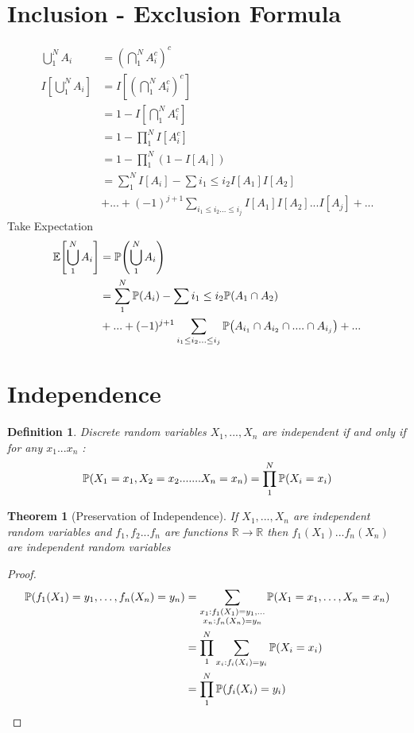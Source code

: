 \documentclass{notes}
\theoremstyle{plain}
\newtheorem{theorem}{Theorem}[chapter]
\newtheorem{definition}{Definition}[chapter]
\newcommand{\bP}{\mathbb{P}}
\newcommand{\bR}{\mathbb{R}}
\newcommand{\bE}{\mathbb{E}}
\newcommand{\prob}[1]{\bP \negthinspace\left(#1\right)}
\newcommand{\expect}[1]{\bE\!\left[#1\right]}
\begin{document}
\section{Inclusion - Exclusion Formula}
\begin{align*}
\bigcup_{1}^{N} A_i &= \left(\bigcap_{1}^{N} A_i^c\right)^c\\
I\left[\bigcup_{1}^{N} A_i\right] 
&=I\left[\left(\bigcap_{1}^{N} A_i^c\right)^c\right]\\
&= 1 - I\left[\bigcap_{1}^{N} A_i^c\right]\\
&= 1 - \prod_1^N I[A_i^c]\\
&= 1 - \prod_1^N\left(1 - I[A_i]\right)\\
&=\sum_1^NI[A_i] - \sum{i_1\le i_2} I[A_1]I[A_2]\\
&+...+ (-1)^{j+1} \sum_{i_1\le i_2 ...\le i_j}I[A_1]I[A_2]...I[A_j] +...
\end{align*}
Take Expectation
\begin{align*}
\expect{\bigcup_{1}^{N} A_i} &= \prob{\bigcup_{1}^{N} A_i}\\
&= \sum_1^N \prob{A_i} - \sum{i_1\le i_2} \prob{A_1 \cap A_2}\\
&+...+(-1)^{j+1}  \sum_{i_1\le i_2 ...\le i_j}
\prob{A_{i_1} \cap A_{i_2}\cap ....\cap A_{i_j}} +...
\end{align*}
\section{Independence}

\begin{definition}
Discrete random variables $X_1,...,X_n$ are independent if and only if for any
$x_1...x_n$ :
\[
\prob{X_1 = x_1, X_2 = x_2.......X_n = x_n} = \prod_1^N \prob{X_i = x_i}
\]
\end{definition}

\begin{theorem}[Preservation of Independence]\hfill
If  $X_1,...,X_n$ are independent random variables and $f_1,f_2...f_n$ are 
functions $\bR \to \bR$ then $ f_1(X_1)...f_n(X_n)$ are independent random
variables

\end{theorem}

\begin{proof}
\begin{align*}
\prob{f_1(X_1) = y_1,\dots, f_n(X_n) = y_n} &=
\sum_{\substack{x_1:f_1(X_1) = y_1, \dots\\ x_n:f_n(X_n) = y_n}}
\prob{X_1 = x_1,\dots,X_n = x_n}\\
&= \prod_1^N \sum_{x_i:f_i(X_i) = y_i} \prob{X_i = x_i}\\
&= \prod_1^N \prob {f_i(X_i) = y_i}
\end{align*}
\end{proof}
\end{document}

